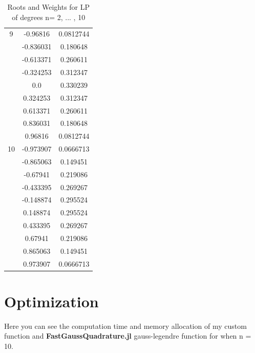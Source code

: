 \documentclass[twoside]{article}
\begin{document}
\begin{table}[H]
{\begin{tabular}{|c|c|c|}
\hline
9 & -0.96816 & 0.0812744 \\
 & -0.836031 & 0.180648 \\
 & -0.613371 & 0.260611 \\
 & -0.324253 & 0.312347 \\
 & 0.0 & 0.330239 \\
 & 0.324253 & 0.312347 \\
 & 0.613371 & 0.260611 \\
 & 0.836031 & 0.180648 \\
 & 0.96816 & 0.0812744 \\
\hline
10 & -0.973907 & 0.0666713 \\
 & -0.865063 & 0.149451 \\
 & -0.67941 & 0.219086 \\
 & -0.433395 & 0.269267 \\
 & -0.148874 & 0.295524 \\
 & 0.148874 & 0.295524 \\
 & 0.433395 & 0.269267 \\
 & 0.67941 & 0.219086 \\
 & 0.865063 & 0.149451 \\
 & 0.973907 & 0.0666713 \\
\hline
\end{tabular} 
}

\caption{Roots and Weights for LP of degrees n= 2, ... , 10}
\end{table}

\newpage

\section{Optimization}

Here you can see the computation time and memory allocation of my custom function and \textbf{FastGaussQuadrature.jl} gauss-legendre function for when n = 10.


\end{document}
